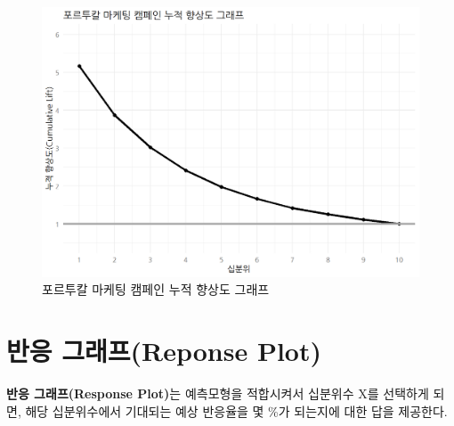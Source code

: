 \documentclass[
  letterpaper,
  chapter,a4paper,showtrims,openright,hidelinks]{oblivoir}
\begin{document}
\begin{figure}

{\centering \includegraphics{images/model_value_lift.png}

}

\caption{포르투칼 마케팅 캠페인 누적 향상도 그래프}

\end{figure}

\hypertarget{predictive-model-caret-business-response-plot}{%
\section{반응 그래프(Reponse
Plot)}\label{predictive-model-caret-business-response-plot}}

\textbf{반응 그래프(Response Plot)}는 예측모형을 적합시켜서 십분위수 X를
선택하게 되면, 해당 십분위수에서 기대되는 예상 반응율을 몇 \%가 되는지에
대한 답을 제공한다.
\end{document}
